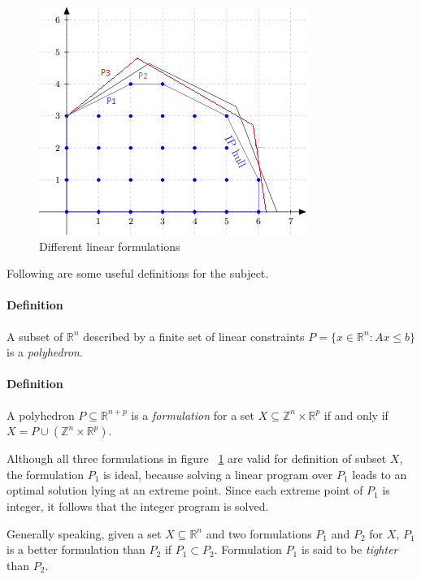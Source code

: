 \begin{figure}[h]
\centering
\hfill\includegraphics[scale=1.0]{figures/linearForm3.png}
\caption{Different linear formulations}
\label{fig:linearForm}
\end{figure}

Following are some useful definitions for the subject.

\paragraph{Definition}
A subset of $\mathbb{R}^{n}$ described by a finite set of linear constraints $P=\{x \in \mathbb{R}^{n}: Ax \le b\}$ is a \textit{polyhedron}.

\paragraph{Definition}
A polyhedron $P \subseteq \mathbb{R}^{n+p}$ is a \textit{formulation} for a set $X \subseteq \mathbb{Z}^{n} \times \mathbb{R}^{p}$ if and only if $X = P \cup (\mathbb{Z}^{n} \times \mathbb{R}^{p})$.

\vspace{7 mm}

Although all three formulations in figure ~\ref{fig:linearForm} are valid for definition of subset $X$, the formulation $P_{1}$ is ideal, because solving a linear program over $P_{1}$ leads to an optimal solution lying at an extreme point. Since each extreme point of $P_{1}$ is integer, it follows that the integer program is solved.

Generally speaking, given a set $X \subseteq \mathbb{R}^n$ and two formulations $P_{1}$ and $P_{2}$ for $X$, $P_{1}$ is a better formulation than $P_{2}$ if $P_{1} \subset P_{2}$. Formulation $P_{1}$ is said to be \textit{tighter} than $P_{2}$.



